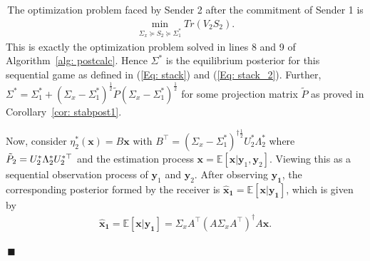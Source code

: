 \documentclass[12pt,journal,onecolumn]{IEEEtran}
\newenvironment{Proof}[1]{\medskip\par\noindent{\bf Proof:\,}\,#1}{{\mbox{\,$\blacksquare$}\par}}
\begin{document}
\begin{Proof}
The optimization problem faced by Sender 2 after the commitment of Sender 1 is
\begin{align*}
    \min_{\Sigma_x\succeq S_2\succeq\Sigma_1^*}Tr(V_2S_2).
\end{align*}
This is exactly the optimization problem solved in lines 8 and 9 of Algorithm~\ref{alg: postcalc}. Hence $\Sigma^*$ is the equilibrium posterior for this sequential game as defined in (\ref{Eq: stack}) and (\ref{Eq: stack_2}). Further, $\Sigma^*=\Sigma_1^*+(\Sigma_x-\Sigma_1^*)^{\frac{1}{2}}\tilde{P}(\Sigma_x-\Sigma_1^*)^{\frac{1}{2}}$ for some projection matrix $\tilde{P}$ as proved in Corollary~\ref{cor: stabpost1}. 

Now, consider $\eta_{2}^*(\boldsymbol{x})=B\boldsymbol{x}$ with $B^\top=(\Sigma_x-\Sigma_{1}^*)^{\dagger\frac{1}{2}}U_{2}^*\Lambda_{2}^*$ where $\Tilde{P}_{2}=U_{2}^*\Lambda_{2}^*U_{2}^{*\top}$ and the estimation process $\boldsymbol{x}=\mathbb{E}[\boldsymbol{x}|\boldsymbol{y}_1,\boldsymbol{y}_2]$. Viewing this as a sequential observation process of $\boldsymbol{y}_1$ and $\boldsymbol{y}_2$. After observing $\boldsymbol{y_1}$, the corresponding posterior formed by the receiver is $\boldsymbol{\hat{x}_1}=\mathbb{E}[\boldsymbol{x}|\boldsymbol{y_1}]$, which is given by
\begin{align}
    \boldsymbol{\hat{x}_1}=\mathbb{E}[\boldsymbol{x}|\boldsymbol{y_1}]= \Sigma_x A^\top(A\Sigma_x A^\top)^{\dagger}A\boldsymbol{x}.
\end{align}


\end{Proof}
\end{document}
